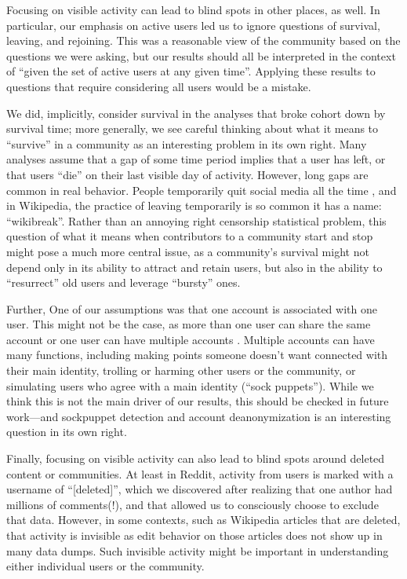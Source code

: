 \documentclass[10pt, oneside, onecolumn]{article}
\begin{document}
Focusing on visible activity can lead to blind spots in other places, as well.  In particular, our emphasis on active users led us to ignore questions of survival, leaving, and rejoining.  This was a reasonable view of the community based on the questions we were asking, but our results should all be interpreted in the context of ``given the set of active users at any given time''.  Applying these results to questions that require considering all users would be a mistake.  

We did, implicitly, consider survival in the analyses that broke cohort down by survival time; more generally, we see careful thinking about what it means to ``survive'' in a community as an interesting problem in its own right.  Many analyses assume that a gap of some time period implies that a user has left, or that users ``die'' on their last visible day of activity.  However, long gaps are common in real behavior.  People temporarily quit social media all the time \cite{Baumer2013}, and in Wikipedia, the practice of leaving temporarily is so common it has a name: ``wikibreak''.    Rather than an annoying right censorship statistical problem, this question of what it means when contributors to a community start and stop might pose a much more central issue, as a community's survival might not depend only in its ability to attract and retain users, but also in the ability to ``resurrect'' old users and leverage ``bursty'' ones.


Further, One of our assumptions was that one account is associated with one user. This might not be the case, as more than one user can share the same account \cite{Lampinen2014} or one user can have multiple accounts \cite{Bergstrom2011}.  Multiple accounts can have many functions, including making points someone doesn't want connected with their main identity, trolling or harming other users or the community, or simulating users who agree with a main identity (``sock puppets'').  While we think this is not the main driver of our results, this should be checked in future work---and sockpuppet detection and account deanonymization is an interesting question in its own right.

Finally, focusing on visible activity can also lead to blind spots around deleted content or communities.  At least in Reddit, activity from users is marked with a username of ``[deleted]'', which we discovered after realizing that one author had millions of comments(!), and that allowed us to consciously choose to exclude that data.  However, in some contexts, such as Wikipedia articles that are deleted, that activity is invisible as edit behavior on those articles does not show up in many data dumps.  Such invisible activity might be important in understanding either individual users or the community. 
\end{document}
